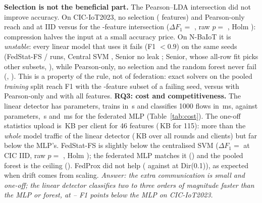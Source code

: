 \textbf{Selection is not the beneficial part.} The Pearson--LDA intersection did not improve accuracy. On CIC-IoT2023, no selection ( features) and Pearson-only reach  and  at IID versus  for the -feature intersection ($\Delta F_1=$ , raw $p=$ , Holm ): compression halves the input at a small accuracy price. On N-BaIoT it is \emph{unstable}: every linear model that uses it fails (F1 $<0.9$) on the same seeds (FedStat-FS / runs, Central SVM , Senior no leak ; Senior, whose all-row fit picks other subsets, ), while Pearson-only, no selection and the random forest never fail (, ). This is a property of the rule, not of federation: exact solvers on the pooled \emph{training} split reach F1  with the -feature subset of a failing seed, versus  with Pearson-only and  with all features.
\textbf{RQ3: cost and competitiveness.} The linear detector has  parameters, trains in \,s and classifies 1000 flows in \,ms, against  parameters, \,s and \,ms for the federated MLP (Table~\ref{tab:cost}). The one-off statistics upload is \,KB per client for 46 features (\,KB for 115): more than the \emph{whole} model traffic of the linear detector (\,KB over all rounds and clients) but far below the MLP's. FedStat-FS is slightly below the centralised SVM ($\Delta F_1=$  at CIC IID, raw $p=$ , Holm ); the federated MLP matches it () and the pooled forest is the ceiling (). FedProx did not help ( against  at Dir(0.1)), as expected when drift comes from scaling. \emph{Answer: the extra communication is small and one-off; the linear detector classifies two to three orders of magnitude faster than the MLP or forest, at -- F1 points below the MLP on CIC-IoT2023.}
